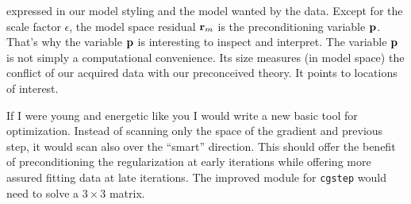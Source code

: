 expressed in our model styling
and the model wanted by the data.
Except for the scale factor $\epsilon$,
the model space residual $\bold r_m$ is the preconditioning variable $\bold p$.
That's why the variable $\bold p$ is interesting to inspect and interpret.
The variable $\bold p$ is not simply a computational convenience.
Its size measures (in model space)
the conflict of our acquired data with our preconceived theory.
It points to locations of interest.
\par
{}

\par
If I were young and energetic like you
I would write a new basic tool for optimization.
Instead of scanning only the space of the gradient and previous step,
it would scan also over the ``smart'' direction.  
This should offer the benefit of preconditioning
the regularization at early iterations
while offering more assured fitting data at late iterations.
The improved 
module for \texttt{cgstep}
would need to solve a $3\times 3$ matrix.



